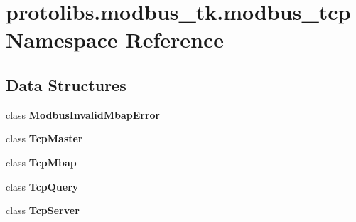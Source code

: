 \section{protolibs.\+modbus\+\_\+tk.\+modbus\+\_\+tcp Namespace Reference}
\label{namespaceprotolibs_1_1modbus__tk_1_1modbus__tcp}
\subsection*{Data Structures}
\begin{DoxyCompactItemize}
\item 
class {\bf Modbus\+Invalid\+Mbap\+Error}
\item 
class {\bf Tcp\+Master}
\item 
class {\bf Tcp\+Mbap}
\item 
class {\bf Tcp\+Query}
\item 
class {\bf Tcp\+Server}
\end{DoxyCompactItemize}
